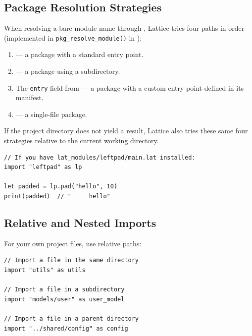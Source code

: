 \subsection{Package Resolution Strategies}\label{subsec:package-resolution}

When resolving a bare module name through , Lattice tries four paths in order (implemented in \lstinline|pkg_resolve_module()| in ):

\begin{enumerate}
  \item {} --- a package with a standard entry point.
  \item {} --- a package using a  subdirectory.
  \item The \texttt{entry} field from  --- a package with a custom entry point defined in its manifest.
  \item {} --- a single-file package.
\end{enumerate}

If the project directory does not yield a result, Lattice also tries these same four strategies relative to the current working directory.

\begin{lstlisting}[language=Lattice, caption={Importing a third-party package}]
// If you have lat_modules/leftpad/main.lat installed:
import "leftpad" as lp

let padded = lp.pad("hello", 10)
print(padded)  // "     hello"
\end{lstlisting}

\subsection{Relative and Nested Imports}\label{subsec:relative-imports}

For your own project files, use relative paths:

\begin{lstlisting}[language=Lattice, caption={Relative path imports}]
// Import a file in the same directory
import "utils" as utils

// Import a file in a subdirectory
import "models/user" as user_model

// Import a file in a parent directory
import "../shared/config" as config
\end{lstlisting}

